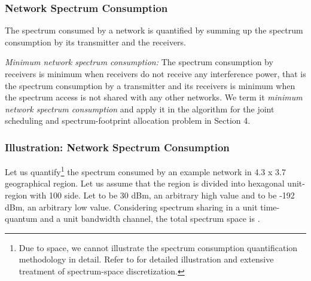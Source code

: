 \documentclass[12pt, draftclsnofoot, onecolumn]{IEEEtran}
\begin{document}
\subsubsection{Network Spectrum Consumption}

The spectrum consumed by a network is quantified by summing up the spectrum consumption by its transmitter and the receivers.



\textit{Minimum network spectrum consumption:}
The spectrum consumption by receivers is minimum when receivers do not receive any interference power, that is the spectrum consumption by a transmitter and its receivers is minimum when the spectrum access is not shared with any other networks. We term it \textit{minimum network spectrum consumption} and apply it in the algorithm for the joint scheduling and spectrum-footprint allocation problem in Section 4.

\subsubsection{Illustration: Network Spectrum Consumption}
\label{illn_setup}
 
Let us quantify\footnote{Due to space, we cannot illustrate the spectrum consumption quantification methodology in detail. Refer to \cite{oms1_sl} for detailed illustration and extensive treatment of spectrum-space discretization.} the spectrum consumed by an example network in 4.3  x 3.7  geographical region. Let us assume that the region is divided into hexagonal unit-region with 100  side. Let  to be 30 dBm, an arbitrary high value and  to be -192 dBm, an arbitrary low value. Considering spectrum sharing in a unit time-quantum and a unit bandwidth channel, the total spectrum space is  . 
\end{document}
